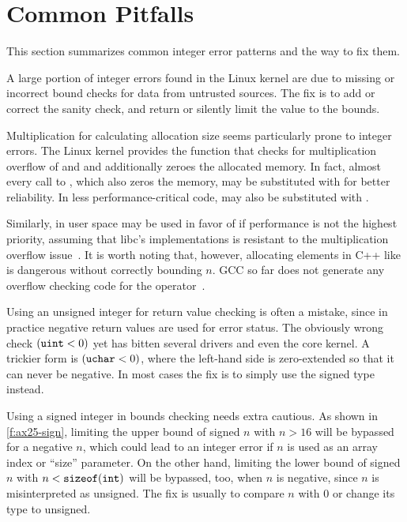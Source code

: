 \section{Common Pitfalls}
\label{s:common}

This section summarizes common integer error patterns and the way
to fix them.

A large portion of integer errors found in the Linux kernel are due
to missing or incorrect bound checks for data from untrusted sources.
The fix is to add or correct the sanity check, and return 
or silently limit the value to the bounds.

Multiplication for calculating allocation size seems particularly
prone to integer errors.  The Linux kernel provides the function
 that checks for multiplication overflow
of  and  and additionally zeroes the allocated
memory.  In fact, almost every call to ,
which also zeros the memory, may be substituted with 
for better reliability.  In less performance-critical code,
 may also be substituted with .

Similarly, in user space  may be used in favor of
 if performance is not the highest priority,
assuming that libc's  implementations is resistant
to the multiplication overflow issue~\cite{rus-cert:calloc}.  It
is worth noting that, however, allocating elements in C++ like  is dangerous without correctly bounding $n$.  GCC so far
does not generate any overflow checking code for the 
operator~\cite{gcc-new}.


Using an unsigned integer for return value checking is often a mistake,
since in practice negative return values are used for error status.
The obviously wrong check $(\texttt{uint} < 0)$ yet has bitten several
drivers and even the core kernel.  A trickier form is $(\texttt{uchar}
< 0)$, where the left-hand side is zero-extended so that it can
never be negative.  In most cases the fix is to simply use the
signed type instead.

Using a signed integer in bounds checking needs extra cautious.  As
shown in \autoref{f:ax25-sign}, limiting the upper bound of signed
$n$ with $n > 16$ will be bypassed for a negative $n$, which could
lead to an integer error if $n$ is used as an array index or ``size''
parameter.  On the other hand, limiting the lower bound of signed
$n$ with $n < \texttt{sizeof}(\texttt{int})$ will be bypassed, too, when
$n$ is negative, since $n$ is misinterpreted as unsigned.  The fix
is usually to compare $n$ with 0 or change its type to unsigned.

